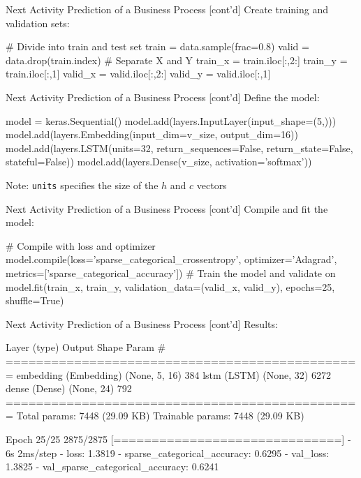 \documentclass[ignorenonframetext,xcolor=x11names]{beamer}
\begin{document}
\begin{frame}[label=withcode,fragile]{Next Activity Prediction of a Business Process \small [cont'd]}
Create training and validation sets:
\begin{pythoncode}
# Divide into train and test set
train = data.sample(frac=0.8)
valid = data.drop(train.index)
# Separate X and Y
train_x = train.iloc[:,2:]
train_y = train.iloc[:,1]
valid_x = valid.iloc[:,2:]
valid_y = valid.iloc[:,1]
\end{pythoncode}
\end{frame}


\begin{frame}[label=withcode,fragile]{Next Activity Prediction of a Business Process \small [cont'd]}
Define the model:
\begin{pythoncode}
model = keras.Sequential()
model.add(layers.InputLayer(input_shape=(5,)))
model.add(layers.Embedding(input_dim=v_size,
                           output_dim=16))
model.add(layers.LSTM(units=32,
                      return_sequences=False,
                      return_state=False,
                      stateful=False))
model.add(layers.Dense(v_size, activation='softmax'))
\end{pythoncode}
Note: \texttt{units} specifies the size of the $h$ and $c$ vectors
\end{frame}

\begin{frame}[label=withcode,fragile]{Next Activity Prediction of a Business Process \small [cont'd]}
Compile and fit the model:
\begin{pythoncode}
# Compile with loss and optimizer
model.compile(loss='sparse_categorical_crossentropy',
              optimizer='Adagrad',
              metrics=['sparse_categorical_accuracy'])
# Train the model and validate on
model.fit(train_x, train_y,
          validation_data=(valid_x, valid_y),
          epochs=25, shuffle=True)
\end{pythoncode}
\end{frame}

\begin{frame}[label=withcode,fragile]{Next Activity Prediction of a Business Process \small [cont'd]}
Results:
\begin{textcode}
 Layer (type)           Output Shape    Param #   
===============================================
 embedding (Embedding)  (None, 5, 16)   384       
 lstm (LSTM)            (None, 32)      6272      
 dense (Dense)          (None, 24)      792                                                                        
===============================================
Total params: 7448 (29.09 KB)
Trainable params: 7448 (29.09 KB)

Epoch 25/25
2875/2875 [==============================] - 6s 2ms/step 
- loss: 1.3819 - sparse_categorical_accuracy: 0.6295 
- val_loss: 1.3825 - val_sparse_categorical_accuracy: 0.6241
\end{textcode}
\end{frame}
\end{document}
